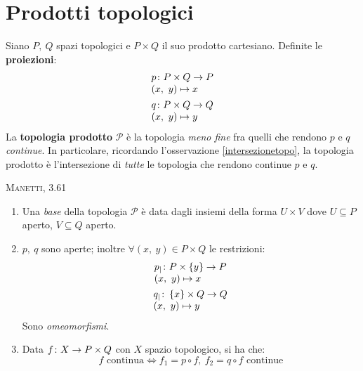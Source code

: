 \section{Prodotti topologici}
\begin{define}
Siano $P,\ Q$ spazi topologici e $P\times Q$ il suo prodotto cartesiano. Definite le \textbf{proiezioni}:
\begin{gather}
\begin{array}{l} p\colon P\times Q\rightarrow P\\ \left(x,\ y\right)\mapsto x \end{array}\\
\begin{array}{l} q\colon P\times Q\rightarrow Q\\ \left(x,\ y\right)\mapsto y \end{array}
\end{gather}
La \textbf{topologia prodotto} $\mathcal{P}$ è la topologia \textit{meno fine} fra quelli che rendono $p$ e $q$ \textit{continue}. In particolare, ricordando l'osservazione \ref{intersezionetopo}, la topologia prodotto è l'intersezione di \textit{tutte} le topologia che rendono continue $p$ e $q$.
\end{define}
\begin{theorema}\textsc{Manetti, 3.61}\label{topprodotto}
\begin{enumerate}
\item Una \textit{base} della topologia $\mathcal{P}$ è data dagli insiemi della forma $U\times V$ dove $U\subseteq P$ aperto, $V\subseteq Q$ aperto.
\item $p,\ q$ sono aperte; inoltre $\forall \left(x,\ y\right)\in P\times Q$ le restrizioni:
\begin{gather}
\begin{array}{l} p_{\mid}\colon P\times \left\{y\right\}\rightarrow P\\ \left(x,\ y\right)\mapsto x \end{array}\\
\begin{array}{l} q_{\mid}\colon \left\{x\right\}\times Q\rightarrow Q\\ \left(x,\ y\right)\mapsto y \end{array}
\end{gather}
Sono \textit{omeomorfismi}.\\
\item Data $f\colon X\rightarrow P\times Q$ con $X$ spazio topologico, si ha che:
\begin{equation}
f\text{ continua}\iff f_1=p\circ f,\ f_2=q\circ f\text{ continue}
\end{equation}
\end{enumerate}
\end{theorema}
